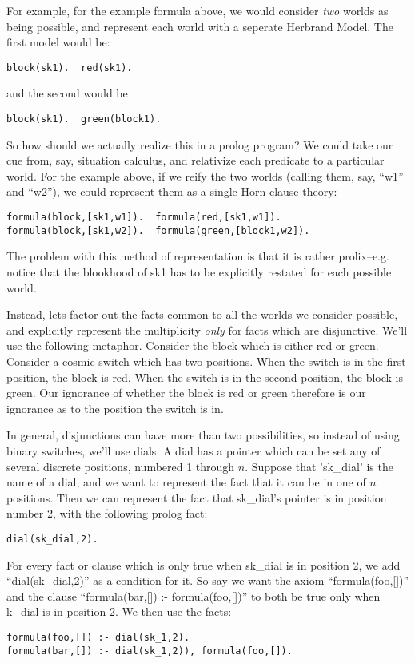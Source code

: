 \documentclass{book}[9pt]
\begin{document}
For example, for the example formula above, we would consider 
{\em  two} worlds as being possible, and represent each world 
with a seperate Herbrand Model.  The first model would be:

\begin{verbatim}
block(sk1).  red(sk1).
\end{verbatim}
\noindent and the second would be
\begin{verbatim}
block(sk1).  green(block1).
\end{verbatim}
\noindent So how should we actually realize this in a prolog program?  We
could take our cue from, say, situation calculus, and relativize each
predicate to a particular world.  For the example above, if we reify the two
worlds (calling them, say, ``w1'' and ``w2''), we could represent them as a
single Horn clause theory:
\begin{verbatim}
formula(block,[sk1,w1]).  formula(red,[sk1,w1]).
formula(block,[sk1,w2]).  formula(green,[block1,w2]).
\end{verbatim}
\noindent The problem with this method of representation is that it is
rather prolix--e.g. notice that the blookhood of sk1 has to be
explicitly restated for each possible world.

Instead, lets factor out the facts common to all the worlds we
consider possible, and explicitly represent the multiplicity {\em
only} for facts which are disjunctive. We'll use the following
metaphor. Consider the block which is either red or green.  Consider a
cosmic switch which has two positions. When the switch is in the first
position, the block is red. When the switch is in the second position,
the block is green. Our ignorance of whether the block is red or green
therefore is our ignorance as to the position the switch is in.

In general, disjunctions can  have  more   than  two  possibilities,  so
instead of using binary switches, we'll use  dials. A dial has a pointer
which can be set any of several   discrete positions, numbered 1 through
$n$. Suppose that 'sk\_dial' is the  name  of   a  dial,  and we want to
represent the fact that it can be in   one of $n$ positions. Then we can
represent the fact that sk\_dial's pointer is in position number 2, with
the following prolog fact:
\begin{verbatim}
dial(sk_dial,2).
\end{verbatim}
\noindent  For every fact or clause which is only true when
sk\_dial is in position 2, we add ``dial(sk\_dial,2)'' as a condition
for it.  So say we want the axiom ``formula(foo,[])'' and
the clause ``formula(bar,[]) :- formula(foo,[])'' to both be true only
when k\_dial is in position 2.  We then use the facts:
\begin{verbatim}
formula(foo,[]) :- dial(sk_1,2).
formula(bar,[]) :- dial(sk_1,2)), formula(foo,[]).
\end{verbatim}
\end{document}
